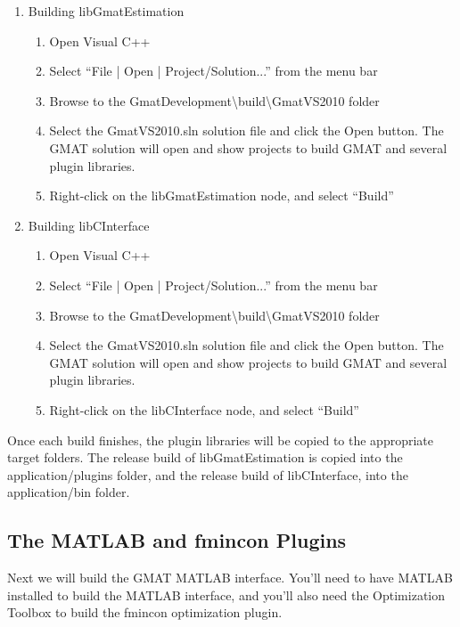 \documentclass[letterpaper,10pt]{article}%
\begin{document}
\begin{enumerate}
\item Building libGmatEstimation
\begin{enumerate}
\item Open Visual C++
\item Select ``File | Open | Project/Solution...'' from the menu bar
\item Browse to the GmatDevelopment\textbackslash build\textbackslash GmatVS2010 folder
\item Select the GmatVS2010.sln solution file and click the Open button.  The GMAT solution will open and show projects to build GMAT and several plugin libraries.
\item Right-click on the libGmatEstimation node, and select ``Build''
\end{enumerate}
\item Building libCInterface
\begin{enumerate}
\item Open Visual C++
\item Select ``File | Open | Project/Solution...'' from the menu bar
\item Browse to the GmatDevelopment\textbackslash build\textbackslash GmatVS2010 folder
\item Select the GmatVS2010.sln solution file and click the Open button.  The GMAT solution will open and show projects to build GMAT and several plugin libraries.
\item Right-click on the libCInterface node, and select ``Build''
\end{enumerate}
\end{enumerate}

Once each build finishes, the plugin libraries will be copied to the appropriate target folders.  The release build of libGmatEstimation is copied into the application/plugins folder, and the release build of libCInterface, into the application/bin folder.

\subsection{The MATLAB and fmincon Plugins}

Next we will build the GMAT MATLAB interface.  You'll need to have MATLAB installed to build the MATLAB interface, and you'll also need the Optimization Toolbox to build the fmincon optimization plugin.
\end{document}
